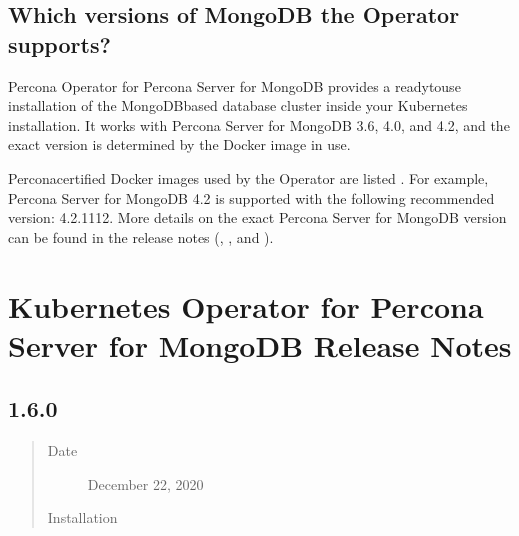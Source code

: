 \documentclass[letterpaper,10pt,english]{sphinxmanual}
\begin{document}
\section{Which versions of MongoDB the Operator supports?}
\label{\detokenize{faq:which-versions-of-mongodb-the-operator-supports}}
Percona Operator for Percona Server for MongoDB provides a ready\sphinxhyphen{}to\sphinxhyphen{}use
installation of the MongoDB\sphinxhyphen{}based database cluster inside your Kubernetes
installation. It works with Percona Server for MongoDB 3.6, 4.0, and 4.2, and
the exact version is determined by the Docker image in use.

Percona\sphinxhyphen{}certified Docker images used by the Operator are listed .
For example, Percona Server for MongoDB 4.2 is supported with the following
recommended version: 4.2.11\sphinxhyphen{}12. More details on the exact Percona
Server for MongoDB version can be found in the release notes (, ,
and ).


\chapter{Kubernetes Operator for Percona Server for MongoDB Release Notes}
\label{\detokenize{RN/index:kubernetes-operator-for-percona-server-for-mongodb-release-notes}}\label{\detokenize{RN/index:rel-notes}}\label{\detokenize{RN/index::doc}}

\section{ 1.6.0}
\label{\detokenize{RN/Kubernetes-Operator-for-PSMONGODB-RN1.6.0:percona-kubernetes-operator-for-percona-server-for-mongodb-1-6-0}}\label{\detokenize{RN/Kubernetes-Operator-for-PSMONGODB-RN1.6.0:k8spsmdb-1-6-0}}\label{\detokenize{RN/Kubernetes-Operator-for-PSMONGODB-RN1.6.0::doc}}\begin{quote}\begin{description}
\item[{Date}] \leavevmode
December 22, 2020

\item[{Installation}] \leavevmode
{}

\end{description}\end{quote}
\end{document}

